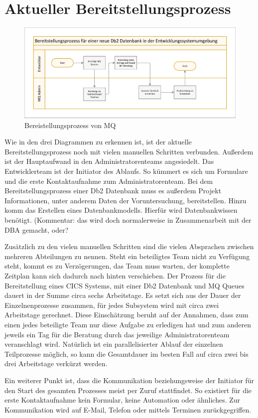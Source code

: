 \section{Aktueller Bereitstellungsprozess}
 \begin{figure}[h]
\centering
\includegraphics[width=\textwidth]{figures/swimlaneMQ.pdf}
\caption{Bereistellungsprozess von MQ}
\label{fig:aktmq}
\end{figure}
Wie in den drei Diagrammen zu erkennen ist, ist der aktuelle Bereitstellungsprozess noch mit vielen manuellen Schritten verbunden.
Außerdem ist der Hauptaufwand in den Administratorenteams angesiedelt.
Das Entwicklerteam ist der Initiator des Ablaufs.
So kümmert es sich um Formulare und die erste Kontaktaufnahme zum Administratorenteam.
Bei dem Bereitstellungsprozess einer Db2 Datenbank muss es außerdem Projekt Informationen, unter anderem Daten der Voruntersuchung, bereitstellen.
Hinzu komm das Erstellen eines Datenbankmodells.
Hierfür wird Datenbankwissen benötigt. (Kommentar: das wird doch normalerweise in Zusammenarbeit mit der DBA gemacht, oder?

Zusätzlich zu den vielen manuellen Schritten sind die vielen Absprachen zwischen mehreren Abteilungen zu nennen.
Steht ein beteiligtes Team nicht zu Verfügung steht, kommt es zu Verzögerungen, das Team muss warten, der komplette Zeitplan kann sich dadurch nach hinten verschieben.
Der Prozess für die Bereitstellung eines CICS Systems, mit einer Db2 Datenbank und MQ Queues dauert in der Summe circa sechs Arbeitstage.
Es setzt sich aus der Dauer der Einzelnenprozesse zusammen, für jedes Subsystem wird mit circa zwei Arbeitstage gerechnet.
Diese Einschätzung beruht auf der Annahmen, dass zum einen jedes beteiligte Team nur diese Aufgabe zu erledigen hat und zum anderen jeweils ein Tag für die Beratung durch das jeweilige Administratorenteam veranschlagt wird.
Natürlich ist ein parallelisierter Ablauf der einzelnen Teilprozesse möglich, so kann die Gesamtdauer im besten Fall auf circa zwei bis drei Arbeitstage verkürzt werden.

Ein weiterer Punkt ist, dass die Kommunikation beziehungsweise der Initiator für den Start des gesamten Prozesses meist per Zuruf stattfindet.
So existiert für die erste Kontaktaufnahme kein Formular, keine Automation oder ähnliches.
Zur Kommunikation wird auf E-Mail, Telefon oder mittels Terminen zurückgegriffen.


 
